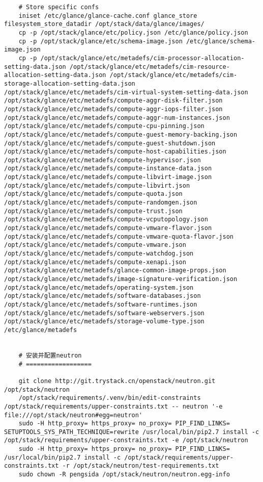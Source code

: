 \documentclass[a4paper,left=1.5cm,right=1.5cm,11pt]{article}
\begin{document}
\begin{lstlisting}
	# Store specific confs
    iniset /etc/glance/glance-cache.conf glance_store filesystem_store_datadir /opt/stack/data/glance/images/
	cp -p /opt/stack/glance/etc/policy.json /etc/glance/policy.json
    cp -p /opt/stack/glance/etc/schema-image.json /etc/glance/schema-image.json
    cp -p /opt/stack/glance/etc/metadefs/cim-processor-allocation-setting-data.json /opt/stack/glance/etc/metadefs/cim-resource-allocation-setting-data.json /opt/stack/glance/etc/metadefs/cim-storage-allocation-setting-data.json /opt/stack/glance/etc/metadefs/cim-virtual-system-setting-data.json /opt/stack/glance/etc/metadefs/compute-aggr-disk-filter.json /opt/stack/glance/etc/metadefs/compute-aggr-iops-filter.json /opt/stack/glance/etc/metadefs/compute-aggr-num-instances.json /opt/stack/glance/etc/metadefs/compute-cpu-pinning.json /opt/stack/glance/etc/metadefs/compute-guest-memory-backing.json /opt/stack/glance/etc/metadefs/compute-guest-shutdown.json /opt/stack/glance/etc/metadefs/compute-host-capabilities.json /opt/stack/glance/etc/metadefs/compute-hypervisor.json /opt/stack/glance/etc/metadefs/compute-instance-data.json /opt/stack/glance/etc/metadefs/compute-libvirt-image.json /opt/stack/glance/etc/metadefs/compute-libvirt.json /opt/stack/glance/etc/metadefs/compute-quota.json /opt/stack/glance/etc/metadefs/compute-randomgen.json /opt/stack/glance/etc/metadefs/compute-trust.json /opt/stack/glance/etc/metadefs/compute-vcputopology.json /opt/stack/glance/etc/metadefs/compute-vmware-flavor.json /opt/stack/glance/etc/metadefs/compute-vmware-quota-flavor.json /opt/stack/glance/etc/metadefs/compute-vmware.json /opt/stack/glance/etc/metadefs/compute-watchdog.json /opt/stack/glance/etc/metadefs/compute-xenapi.json /opt/stack/glance/etc/metadefs/glance-common-image-props.json /opt/stack/glance/etc/metadefs/image-signature-verification.json /opt/stack/glance/etc/metadefs/operating-system.json /opt/stack/glance/etc/metadefs/software-databases.json /opt/stack/glance/etc/metadefs/software-runtimes.json /opt/stack/glance/etc/metadefs/software-webservers.json /opt/stack/glance/etc/metadefs/storage-volume-type.json /etc/glance/metadefs


	# 安装并配置neutron
	# ==================

	git clone http://git.trystack.cn/openstack/neutron.git /opt/stack/neutron
	/opt/stack/requirements/.venv/bin/edit-constraints /opt/stack/requirements/upper-constraints.txt -- neutron '-e file:///opt/stack/neutron#egg=neutron'
	sudo -H http_proxy= https_proxy= no_proxy= PIP_FIND_LINKS= SETUPTOOLS_SYS_PATH_TECHNIQUE=rewrite /usr/local/bin/pip2.7 install -c /opt/stack/requirements/upper-constraints.txt -e /opt/stack/neutron
	sudo -H http_proxy= https_proxy= no_proxy= PIP_FIND_LINKS= /usr/local/bin/pip2.7 install -c /opt/stack/requirements/upper-constraints.txt -r /opt/stack/neutron/test-requirements.txt
	sudo chown -R pengsida /opt/stack/neutron/neutron.egg-info


\end{lstlisting}
\end{document}

